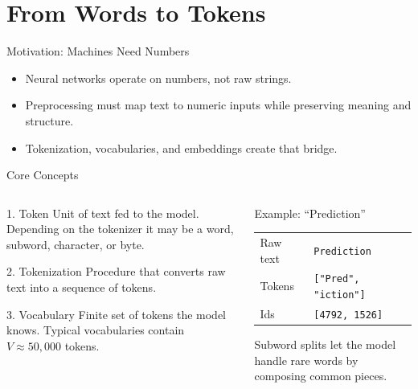 \documentclass[aspectratio=169]{beamer}
\begin{document}
\section{From Words to Tokens}

\begin{frame}{Motivation: Machines Need Numbers}
  \begin{itemize}
    \item Neural networks operate on numbers, not raw strings.
    \item Preprocessing must map text to numeric inputs while preserving meaning and structure.
    \item Tokenization, vocabularies, and embeddings create that bridge.
  \end{itemize}
\end{frame}

\begin{frame}{Core Concepts}
  \begin{columns}[T,onlytextwidth]
    \begin{column}{0.53\linewidth}
      \begin{block}{1. Token}
        Unit of text fed to the model. Depending on the tokenizer it may be a word, subword, character, or byte.
      \end{block}
      \begin{block}{2. Tokenization}
        Procedure that converts raw text into a sequence of tokens. 
      \end{block}
      \begin{block}{3. Vocabulary}
        Finite set of tokens the model knows. Typical vocabularies contain $V \approx 50{,}000$ tokens.
      \end{block}
    \end{column}
    \begin{column}{0.42\linewidth}
      \begin{exampleblock}{Example: ``Prediction''}
        \begin{tabular}{@{}ll@{}}
          Raw text & \texttt{Prediction} \\
          Tokens & \texttt{["Pred", "iction"]} \\
          Ids & \texttt{[4792, 1526]} \\
        \end{tabular}
        Subword splits let the model handle rare words by composing common pieces.
      \end{exampleblock}
    \end{column}
  \end{columns}
\end{frame}
\end{document}

